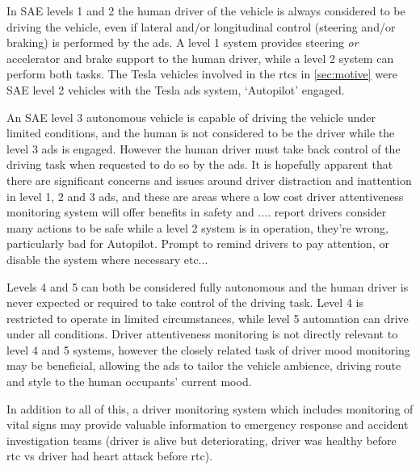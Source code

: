 \documentclass[11pt, parskip=half*,twoside=false]{scrbook}
\begin{document}
In SAE levels 1 and 2 the human driver of the vehicle is always considered to be driving the vehicle, even if lateral and/or longitudinal control (steering and/or braking) is performed by the \gls{ads}. A level 1 system provides steering \emph{or} accelerator and brake support to the human driver, while a level 2 system can perform both tasks. The Tesla vehicles involved in the \glspl{rtc} in \cref{sec:motive} were SAE level 2 vehicles with the Tesla \gls{ads} system, `Autopilot' engaged. 

An SAE level 3 autonomous vehicle is capable of driving the vehicle under limited conditions, and the human is not considered to be the driver while the level 3 \gls{ads} is engaged. However the human driver must take back control of the driving task when requested to do so by the \gls{ads}. It is hopefully apparent that there are significant concerns and issues around driver distraction and inattention in level 1, 2 and 3 \gls{ads}, and these are areas where a low cost driver attentiveness monitoring system will offer benefits in safety and ....  \citet{teohWhatNameDrivers2020} report drivers consider many actions to be safe while a level 2 system is in operation, they're wrong, particularly bad for Autopilot. Prompt to remind drivers to pay attention, or disable the system where necessary etc...

Levels 4 and 5 can both be considered fully autonomous and the human driver is never expected or required to take control of the driving task. Level 4 is restricted to operate in limited circumstances, while level 5 automation can drive under all conditions. Driver attentiveness monitoring is not directly relevant to level 4 and 5 systems, however the closely related task of driver mood monitoring may be beneficial, allowing the \gls{ads} to tailor the vehicle ambience, driving route and style to the human occupants' current mood.

In addition to all of this, a driver monitoring system which includes monitoring of vital signs may provide valuable information to emergency response and accident investigation teams (driver is alive but deteriorating, driver was healthy before \gls{rtc} vs driver had heart attack before \gls{rtc}). 
\end{document}
